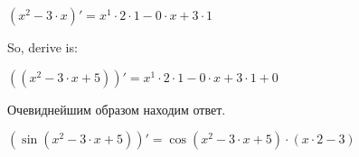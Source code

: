\documentclass[12pt,a4paper]{article}
\begin{document}
\begin{center}
\begin{math}
 \left ( {x}^{2}-3 \cdot x \right)'={x}^{1} \cdot 2 \cdot 1-0 \cdot x+3 \cdot 1
\end{math}
\end{center}
So, derive is:

\begin{center}
\begin{math}
 \left ( \left({x}^{2}-3 \cdot x+5 \right ) \right)'={x}^{1} \cdot 2 \cdot 1-0 \cdot x+3 \cdot 1+0
\end{math}
\end{center}
Очевиднейшим образом находим ответ.

\begin{center}
\begin{math}
 \left ( \sin{\left({x}^{2}-3 \cdot x+5 \right )} \right)'=\cos{\left({x}^{2}-3 \cdot x+5 \right )} \cdot \left(x \cdot 2-3 \right )
\end{math}
\end{center}
\end{document}
